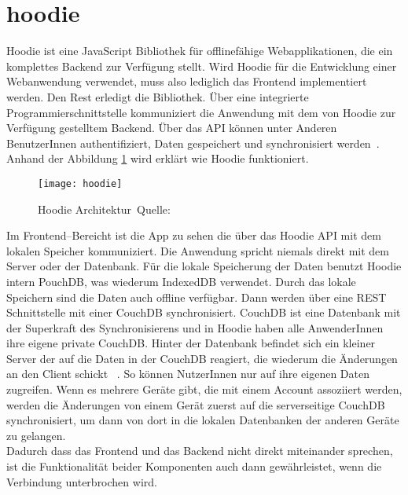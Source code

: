 \section{hoodie}
Hoodie ist eine JavaScript Bibliothek für offlinefähige Webapplikationen, die ein komplettes Backend zur Verfügung stellt. Wird Hoodie für die Entwicklung einer Webanwendung verwendet, muss also lediglich das Frontend implementiert werden. Den Rest erledigt die Bibliothek. Über eine integrierte Programmierschnittstelle kommuniziert die Anwendung mit dem von Hoodie zur Verfügung gestelltem Backend. Über das \gls{API} können unter Anderen BenutzerInnen authentifiziert, Daten gespeichert und synchronisiert werden~\cite{hoodie}.\\
Anhand der Abbildung \ref{fig:hoodie} wird erklärt wie Hoodie funktioniert.
\begin{figure}[H]
  \centering
  \texttt{[image: hoodie]}
  \grayRule
  \caption[Hoodie Architektur]{Hoodie Architektur~Quelle:~\cite{hoodie-how}}
  \label{fig:hoodie}
\end{figure}
Im Frontend--Bereicht ist die App zu sehen die über das Hoodie \gls{API} mit dem lokalen Speicher kommuniziert. Die Anwendung spricht niemals direkt mit dem Server oder der Datenbank. Für die lokale Speicherung der Daten benutzt Hoodie intern PouchDB, was wiederum IndexedDB verwendet. Durch das lokale Speichern sind die Daten auch offline verfügbar. Dann werden über eine \gls{REST} Schnittstelle mit einer CouchDB synchronisiert. CouchDB ist eine Datenbank mit der Superkraft des Synchronisierens und in Hoodie haben alle AnwenderInnen ihre eigene private CouchDB. Hinter der Datenbank befindet sich ein kleiner Server der auf die Daten in der CouchDB reagiert, die wiederum die Änderungen an den Client schickt ~\cite{hoodie-how}.
So können NutzerInnen nur auf ihre eigenen Daten zugreifen. Wenn es mehrere Geräte gibt, die mit einem Account assoziiert werden, werden die Änderungen von einem Gerät zuerst auf die serverseitige CouchDB synchronisiert, um dann von dort in die lokalen Datenbanken der anderen Geräte zu gelangen.\\
Dadurch dass das Frontend und das Backend nicht direkt miteinander sprechen, ist die Funktionalität beider Komponenten auch dann gewährleistet, wenn die Verbindung unterbrochen wird.